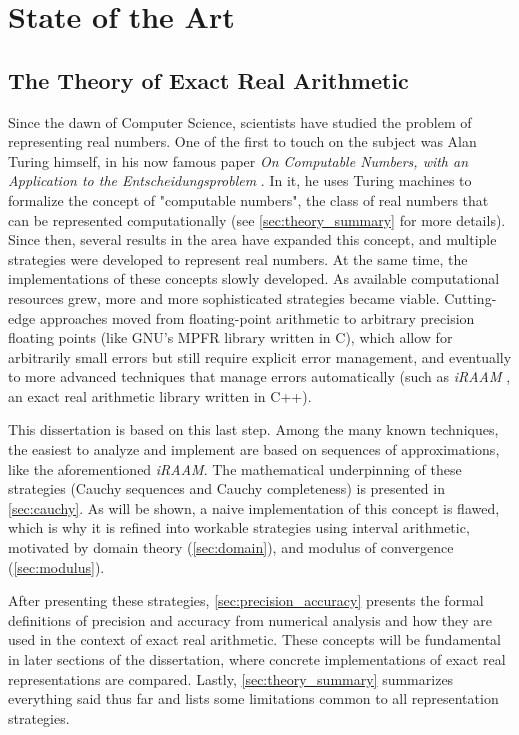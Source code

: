 \chapter{State of the Art}
\label{chap:state_art}

\section{The Theory of Exact Real Arithmetic}
\label{sec:theory}

Since the dawn of Computer Science, scientists have studied the problem of representing real numbers. One of the first to touch on the subject was Alan Turing himself, in his now famous paper \textit{On Computable Numbers, with an Application to the Entscheidungsproblem} \cite{Tur37}. In it, he uses Turing machines to formalize the concept of "computable numbers", the class of real numbers that can be represented computationally (see \cref{sec:theory_summary} for more details). Since then, several results in the area have expanded this concept, and multiple strategies were developed to represent real numbers. At the same time, the implementations of these concepts slowly developed. As available computational resources grew, more and more sophisticated strategies became viable. Cutting-edge approaches moved from floating-point arithmetic to arbitrary precision floating points (like GNU's MPFR library \cite{MPFR} written in C), which allow for arbitrarily small errors but still require explicit error management, and eventually to more advanced techniques that manage errors automatically (such as \textit{iRAAM} \cite{iRRAM}, an exact real arithmetic library written in C++).

This dissertation is based on this last step. Among the many known techniques, the easiest to analyze and implement are based on sequences of approximations, like the aforementioned \textit{iRAAM}. The mathematical underpinning of these strategies (Cauchy sequences and Cauchy completeness) is presented in \cref{sec:cauchy}. As will be shown, a naive implementation of this concept is flawed, which is why it is refined into workable strategies using interval arithmetic, motivated by domain theory (\cref{sec:domain}), and modulus of convergence (\cref{sec:modulus}).

After presenting these strategies, \cref{sec:precision_accuracy} presents the formal definitions of precision and accuracy from numerical analysis and how they are used in the context of exact real arithmetic. These concepts will be fundamental in later sections of the dissertation, where concrete implementations of exact real representations are compared. Lastly, \cref{sec:theory_summary} summarizes everything said thus far and lists some limitations common to all representation strategies.


